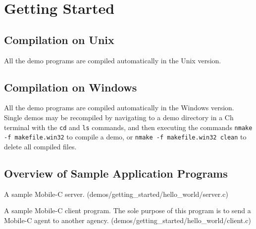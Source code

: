 \documentclass[11pt]{report}
\begin{document}
\chapter{Getting Started}
\section{Compilation on Unix}
All the demo programs are compiled automatically in the Unix version.

\section{Compilation on Windows}
All the demo programs are compiled automatically in the Windows version. Single
demos may be recompiled by navigating to a demo directory in a Ch terminal with
the \texttt{cd} and \texttt{ls} commands, and then executing the commands
\texttt{nmake -f makefile.win32} to compile a demo, or \texttt{nmake -f
makefile.win32 clean} to delete all compiled files.

\section{Overview of Sample Application Programs}
\begin{Program}[!h]
\capstart
\begin{center}
   {\footnotesize \linespread{1.0} }
\end{center}
\caption{A sample Mobile-C server. (demos/getting\_started/hello\_world/server.c)}
\label{prog:server.c}
\end{Program}

\begin{Program}%
\capstart
\begin{center}
   {\footnotesize \linespread{1.0} }
\end{center}
\caption{A sample Mobile-C client program. The sole purpose of this program is to
  send a Mobile-C agent to another agency. (demos/getting\_started/hello\_world/client.c)}
\label{prog:client.c}
\end{Program}
\end{document}

